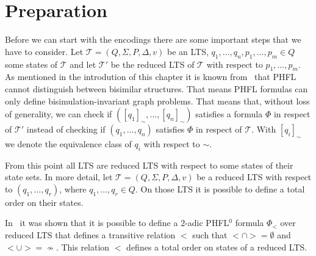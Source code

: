 \section{Preparation}\label{sec:lower_bounds_preparation}

Before we can start with the encodings there are some important steps that we have to consider.  Let $\mathcal{T} = (Q, 
\Sigma, P, \Delta, v)$ be an LTS, $q_1, \dots, q_n, p_1, \dots, p_m \in Q$ some states of $\mathcal{T}$ and let $\mathcal{T}'$ be the 
reduced LTS of $\mathcal{T}$ with respect to $p_1, \dots, p_m$.  
As mentioned in the introdution of this chapter it is known from~\cite{lange2014capturing} that PHFL cannot distinguish 
between bisimilar structures. That means PHFL formulas can only define bisimulation-invariant graph problems. That means that, without loss of generality, we can check if $([q_1]_\sim, \dots, [q_n]_\sim)$ satisfies a formula $\Phi$ in respect of $\mathcal{T}'$ instead of checking if $(q_1, \dots, q_n)$ satisfies 
$\Phi$ in respect of $\mathcal{T}$. With $[q_i]_\sim$ we denote the equivalence class of $q_i$ with respect to $\sim$.

From this point all LTS are reduced LTS with respect to some states of their state sets. In more detail, let $\mathcal{T} = (Q, \Sigma, P, \Delta, v)$ be a reduced LTS with respect to $(q_1, \dots, q_r)$, where $q_1, \dots, q_r \in Q$. On those LTS it is possible to define a total order on their states. 

\begin{remark} \label{remark:transitive_relation}
    In~\cite{otto1999bisimulation} it was shown that it is possible to define a $2$-adic PHFL$^0$ formula $\Phi_<$ over reduced LTS that defines a
    transitive relation $<$ such that $< \cap > = \emptyset$ and $< \cup > = \not\sim$. This relation $<$ defines a total
    order on states of a reduced LTS.
\end{remark}